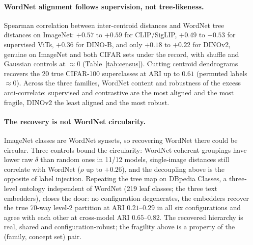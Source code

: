 \documentclass{article}
\begin{document}
\paragraph{WordNet alignment follows supervision, not tree-likeness.} Spearman correlation between inter-centroid distances and WordNet tree distances on ImageNet: $+0.57$ to $+0.59$ for CLIP/SigLIP, $+0.49$ to $+0.53$ for supervised ViTs, $+0.36$ for DINO-B, and only $+0.18$ to $+0.22$ for DINOv2, genuine on ImageNet and both CIFAR sets under the record, with shuffle and Gaussian controls at $\approx0$ (Table~\ref{tab:census}). Cutting centroid dendrograms recovers the 20 true CIFAR-100 superclasses at ARI up to $0.61$ (permuted labels $\approx0$). Across the three families, WordNet content and robustness of the excess anti-correlate: supervised and contrastive are the most aligned and the most fragile, DINOv2 the least aligned and the most robust. %

\paragraph{The recovery is not WordNet circularity.} ImageNet classes are WordNet synsets, so recovering WordNet there could be circular. Three controls bound the circularity: WordNet-coherent groupings have lower raw $\delta$ than random ones in 11/12 models, single-image distances still correlate with WordNet ($\rho$ up to $+0.26$), and the decoupling above is the opposite of label injection. Repeating the tree map on DBpedia Classes, a three-level ontology independent of WordNet (219 leaf classes; the three text embedders), closes the door: no configuration degenerates, the embedders recover the true 70-way level-2 partition at ARI $0.21$--$0.29$ in all six configurations and agree with each other at cross-model ARI $0.65$--$0.82$. The recovered hierarchy is real, shared and configuration-robust; the fragility above is a property of the (family, concept set) pair. %
\end{document}
